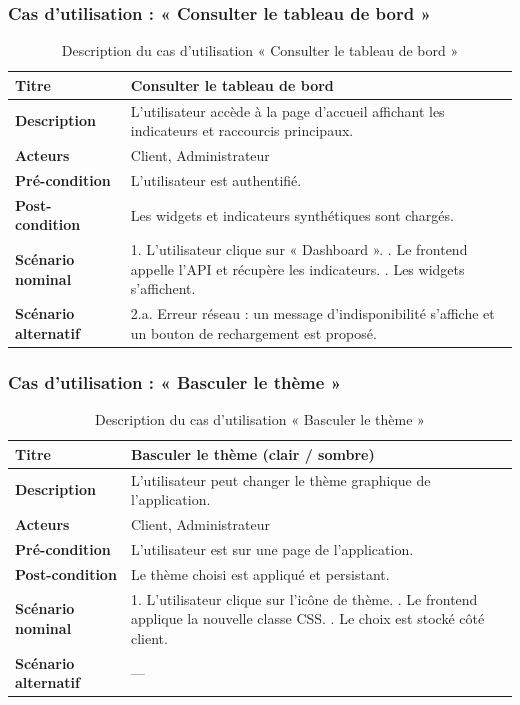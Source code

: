 \subsubsection{Cas d'utilisation : « Consulter le tableau de bord »}
\begin{table}[h!]
\centering
\renewcommand{\arraystretch}{1.3}
\begin{tabularx}{\textwidth}{|l|X|}
\hline
\textbf{Titre} & Consulter le tableau de bord \\ \hline
\textbf{Description} & L'utilisateur accède à la page d'accueil affichant les
indicateurs et raccourcis principaux. \\ \hline
\textbf{Acteurs} & Client, Administrateur \\ \hline
\textbf{Pré-condition} & L'utilisateur est authentifié. \\ \hline
\textbf{Post-condition} & Les widgets et indicateurs synthétiques sont chargés. \\ \hline
\textbf{Scénario nominal} &
1. L'utilisateur clique sur « Dashboard ». \newline
2. Le frontend appelle l'API et récupère les indicateurs. \newline
3. Les widgets s'affichent. \\ \hline
\textbf{Scénario alternatif} &
2.a. Erreur réseau : un message d'indisponibilité s'affiche et un bouton de rechargement
est proposé. \\ \hline
\end{tabularx}
\caption{Description du cas d'utilisation « Consulter le tableau de bord »}
\end{table}

\subsubsection{Cas d'utilisation : « Basculer le thème »}
\begin{table}[h!]
\centering
\renewcommand{\arraystretch}{1.3}
\begin{tabularx}{\textwidth}{|l|X|}
\hline
\textbf{Titre} & Basculer le thème (clair / sombre) \\ \hline
\textbf{Description} & L'utilisateur peut changer le thème graphique de l'application. \\ \hline
\textbf{Acteurs} & Client, Administrateur \\ \hline
\textbf{Pré-condition} & L'utilisateur est sur une page de l'application. \\ \hline
\textbf{Post-condition} & Le thème choisi est appliqué et persistant. \\ \hline
\textbf{Scénario nominal} &
1. L'utilisateur clique sur l'icône de thème. \newline
2. Le frontend applique la nouvelle classe CSS. \newline
3. Le choix est stocké côté client. \\ \hline
\textbf{Scénario alternatif} & --- \\ \hline
\end{tabularx}
\caption{Description du cas d'utilisation « Basculer le thème »}
\end{table}

